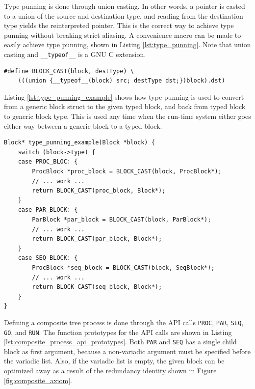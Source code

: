 Type punning is done through union casting. In other words, a pointer is casted to a union of the source and destination type, and reading from the destination type yields the reinterpreted pointer. This is the correct way to achieve type punning without breaking strict aliasing. A convenience macro can be made to easily achieve type punning, shown in Listing \ref{lst:type_punning}. Note that union casting and \texttt{\_\_typeof\_\_} is a GNU C extension.

\noindent\begin{minipage}{\textwidth}
\begin{lstlisting}[style={CustomC},caption={Type punning through union cast},label={lst:type_punning}]
#define BLOCK_CAST(block, destType) \
    (((union {__typeof__(block) src; destType dst;})block).dst)
\end{lstlisting}
\end{minipage}

Listing \ref{lst:type_punning_example} shows how type punning is used to convert from a generic block struct to the given typed block, and back from typed block to generic block type. This is used any time when the run\hyp{}time system either goes either way between a generic block to a typed block. 

\noindent\begin{minipage}{\textwidth}
\begin{lstlisting}[style={CustomC},caption={Type punning example},label={lst:type_punning_example}]
Block* type_punning_example(Block *block) {
    switch (block->type) {
    case PROC_BLOC: {
        ProcBlock *proc_block = BLOCK_CAST(block, ProcBlock*);
        // ... work ...
        return BLOCK_CAST(proc_block, Block*);
    }
    case PAR_BLOCK: {
        ParBlock *par_block = BLOCK_CAST(block, ParBlock*);
        // ... work ...
        return BLOCK_CAST(par_block, Block*);
    }
    case SEQ_BLOCK: {
        ProcBlock *seq_block = BLOCK_CAST(block, SeqBlock*);
        // ... work ...
        return BLOCK_CAST(seq_block, Block*);
    }
}
\end{lstlisting}
\end{minipage}

Defining a composite tree process is done through the API calls \texttt{PROC}, \texttt{PAR}, \texttt{SEQ}, \texttt{GO}, and \texttt{RUN}. The function prototypes for the API calls are shown in Listing \ref{lst:composite_process_api_prototypes}. Both \texttt{PAR} and \texttt{SEQ} has a single child block as first argument, because a non\hyp{}variadic argument must be specified before the variadic list. Also, if the variadic list is empty, the given block can be optimized away as a result of the redundancy identity shown in Figure \ref{fig:composite_axiom}.

